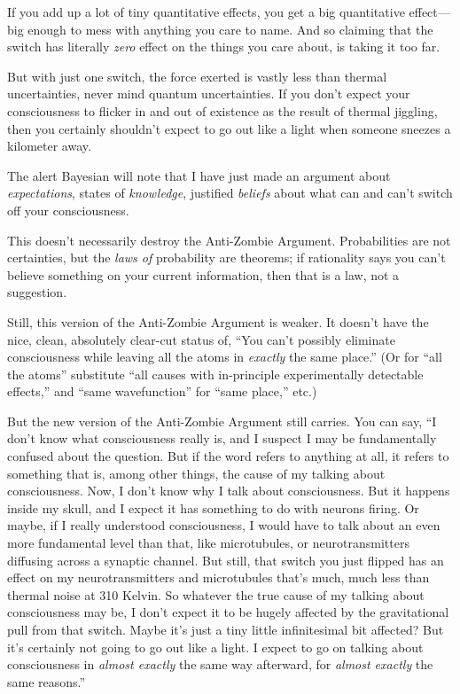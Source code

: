 {
 If you add up a lot of tiny quantitative effects, you get a big
quantitative effect---big enough to mess with anything you care to
name. And so claiming that the switch has literally \textit{zero}
effect on the things you care about, is taking it too far.}

{
 But with just one switch, the force exerted is vastly less than
thermal uncertainties, never mind quantum uncertainties. If you
don't expect your consciousness to flicker in and out
of existence as the result of thermal jiggling, then you certainly
shouldn't expect to go out like a light when someone
sneezes a kilometer away.}

{
 The alert Bayesian will note that I have just made an argument
about \textit{expectations}, states of \textit{knowledge}, justified
\textit{beliefs} about what can and can't switch off
your consciousness.}

{
 This doesn't necessarily destroy the Anti-Zombie
Argument. Probabilities are not certainties, but the \textit{laws of}
probability are theorems; if rationality says you can't
believe something on your current information, then that is a law, not
a suggestion.}

{
 Still, this version of the Anti-Zombie Argument is weaker. It
doesn't have the nice, clean, absolutely clear-cut
status of, ``You can't possibly
eliminate consciousness while leaving all the atoms in \textit{exactly}
the same place.'' (Or for ``all the
atoms'' substitute ``all causes with
in-principle experimentally detectable effects,'' and
``same wavefunction'' for
``same place,'' etc.)}

{
 But the new version of the Anti-Zombie Argument still carries. You
can say, ``I don't know what
consciousness really is, and I suspect I may be fundamentally confused
about the question. But if the word refers to anything at all, it
refers to something that is, among other things, the cause of my
talking about consciousness. Now, I don't know why I
talk about consciousness. But it happens inside my skull, and I expect
it has something to do with neurons firing. Or maybe, if I really
understood consciousness, I would have to talk about an even more
fundamental level than that, like microtubules, or neurotransmitters
diffusing across a synaptic channel. But still, that switch you just
flipped has an effect on my neurotransmitters and microtubules
that's much, much less than thermal noise at 310
Kelvin. So whatever the true cause of my talking about consciousness
may be, I don't expect it to be hugely affected by the
gravitational pull from that switch. Maybe it's just a
tiny little infinitesimal bit affected? But it's
certainly not going to go out like a light. I expect to go on talking
about consciousness in \textit{almost exactly} the same way afterward,
for \textit{almost exactly} the same reasons.''}

